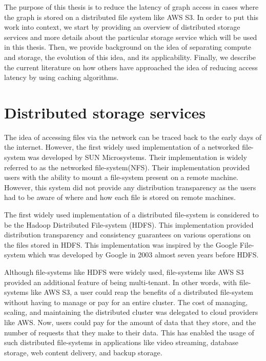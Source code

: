 The purpose of this thesis is to reduce the latency of graph access in cases
where the graph is stored on a distributed file system like AWS S3. In order to
put this work into context, we start by providing an overview of distributed
storage services and more details about the particular storage service which
will be used in this thesis. Then, we provide background on the idea of
separating compute and storage, the evolution of this idea, and its
applicability. Finally, we describe the current literature on how others have
approached the idea of reducing access latency by using caching algorithms.

\section{Distributed storage services}\label{sec:distributedStorage}
The idea of accessing files via the network can be traced back to the early days
of the internet. However, the first widely used implementation of a networked
file-system was developed by SUN Microsystems\cite{nfs1986}. Their implementation
is widely referred to as the networked file-system(NFS). Their implementation
provided users with the ability to mount a file-system present on a remote
machine. However, this system did not provide any distribution transparency as
the users had to be aware of where and how each file is stored on remote
machines. 

\medskip
The first widely used implementation of a distributed file-system is considered
to be the Hadoop Distributed File-system (HDFS)\cite{shvachko2010hadoop}. This
implementation provided distribution transparency and consistency guarantees on
various operations on the files stored in HDFS. This implementation was inspired
by the Google File-system\cite{ghemawat2003google} which was developed by Google
in 2003 almost seven years before HDFS.

\medskip
Although file-systems like HDFS were widely used, file-systems like AWS
S3\cite{awsS3} provided an additional feature of being multi-tenant. In other
words, with file-systems like AWS S3, a user could reap the benefits of a
distributed file-system without having to manage or pay for an entire cluster.
The cost of managing, scaling, and maintaining the distributed cluster was
delegated to cloud providers like AWS. Now, users could pay for the amount of
data that they store, and the number of requests that they make to their data.
This has enabled the usage of such distributed file-systems in applications like
video streaming, database storage\cite{snowflake}, web content 
delivery, and backup storage.

